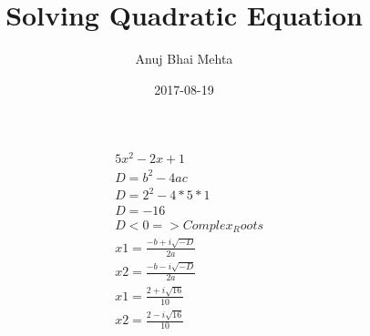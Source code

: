 \documentclass{article}
\title{Solving Quadratic Equation}
\date{2017-08-19}
\author{Anuj Bhai Mehta}
\begin{document}
 
\maketitle

\begin{align*}
&   5 x^2 - 2 x + 1 \\
&	D = b^2 - 4ac \\
&	D = 2^2 - 4*5*1 \\
&	D = -16 \\
&	D < 0 => Complex_Roots \\
& 	x1 = \frac{-b + i{\sqrt{-D}}}{2a} \\
& 	x2 = \frac{-b - i{\sqrt{-D}}}{2a} \\
&	x1 = \frac{2 + i{\sqrt{16}}}{10} \\
& 	x2 = \frac{2 - i{\sqrt{16}}}{10} 
\end{align*}
\end{document}
